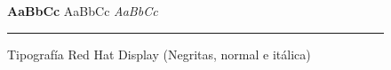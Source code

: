 \vspace{1em}
\begin{figure}[H]
    \centering
    {\sffamily\LARGE\selectfont \textbf{AaBbCc} \quad  AaBbCc \quad \textit{AaBbCc}}
    \vspace{1em}
    \textcolor{DarkBlue}{\rule{\linewidth}{0.2pt}}
    \vspace*{-2em}
    \caption{Tipografía Red Hat Display (Negritas, normal e itálica)}
    \label{fig:tipografía_red_hat_display}
\end{figure}